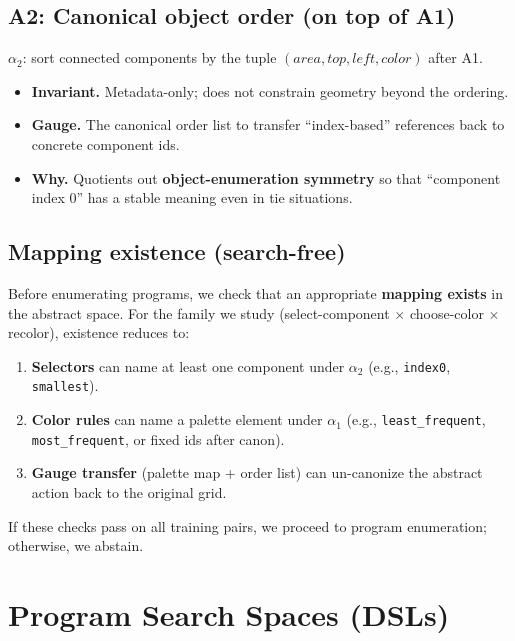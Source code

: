 \documentclass[11pt]{article}
\newcommand{\code}[1]{\texttt{#1}}
\begin{document}
\subsection{A2: Canonical object order (on top of A1)}

$\alpha_2$: sort connected components by the tuple $(area, top, left, color)$ after A1.

\begin{itemize}
\item \textbf{Invariant.} Metadata-only; does not constrain geometry beyond the ordering.
\item \textbf{Gauge.} The canonical order list to transfer ``index-based'' references back to concrete component ids.
\item \textbf{Why.} Quotients out \textbf{object-enumeration symmetry} so that ``component index 0'' has a stable meaning even in tie situations.
\end{itemize}

\subsection{Mapping existence (search-free)}

Before enumerating programs, we check that an appropriate \textbf{mapping exists} in the abstract space. For the family we study (select-component $\times$ choose-color $\times$ recolor), existence reduces to:
\begin{enumerate}
\item \textbf{Selectors} can name at least one component under $\alpha_2$ (e.g., \code{index0}, \code{smallest}).
\item \textbf{Color rules} can name a palette element under $\alpha_1$ (e.g., \code{least\_frequent}, \code{most\_frequent}, or fixed ids after canon).
\item \textbf{Gauge transfer} (palette map + order list) can un-canonize the abstract action back to the original grid.
\end{enumerate}

If these checks pass on all training pairs, we proceed to program enumeration; otherwise, we abstain.

\section{Program Search Spaces (DSLs)}
\end{document}
